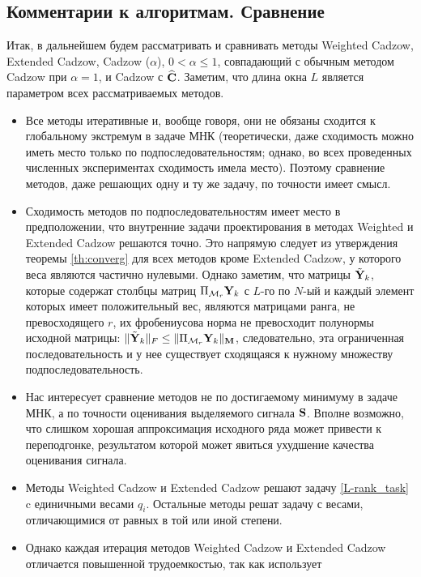 \documentclass[12pt,a4paper,fleqn,leqno]{article}
\begin{document}
\subsection{Комментарии к алгоритмам. Сравнение}

Итак, в дальнейшем будем рассматривать и сравнивать методы
Weighted Cadzow, Extended Cadzow, Cadzow ($\alpha$), $0< \alpha \leq 1$, совпадающий с обычным методом Cadzow при $\alpha=1$,
и Cadzow с $\widehat {\mathbf{C}}$.
Заметим, что длина окна $L$ является параметром всех рассматриваемых методов.

\begin{itemize}
\item
Все методы итеративные и, вообще говоря, они не обязаны сходится к глобальному экстремум в задаче МНК  (теоретически, даже сходимость можно иметь место только по подпоследовательностям; однако, во всех проведенных численных экспериментах сходимость имела место). Поэтому сравнение методов, даже
решающих одну и ту же задачу,  по точности имеет смысл.
\item
Сходимость методов по подпоследовательностям имеет место в предположении, что внутренние задачи проектирования в методах Weighted и Extended Cadzow решаются точно. Это напрямую следует из утверждения теоремы \ref{th:converg} для всех методов кроме Extended Cadzow, у которого веса являются частично нулевыми. Однако заметим, что  матрицы $\tilde {\mathbf{Y}}_k$, которые содержат столбцы матриц $\Pi_{\mathcal{M}_r} \mathbf{Y}_k$ с $L$-го по $N$-ый и каждый элемент которых имеет положительный вес, являются матрицами ранга, не превосходящего $r$, их фробениусова норма не превосходит полунормы исходной матрицы: $\|\tilde {\mathbf{Y}}_k\|_F \le \|\Pi_{\mathcal{M}_r} \mathbf{Y}_k\|_{\mathbf{M}}$, следовательно, эта ограниченная последовательность и у нее существует сходящаяся к нужному множеству подпоследовательность.
\item
Нас интересует сравнение методов не по достигаемому минимуму в задаче МНК, а по точности оценивания выделяемого сигнала $\mathbf{S}$.
Вполне возможно, что слишком хорошая аппроксимация исходного ряда может привести к переподгонке, результатом которой
может явиться ухудшение качества оценивания сигнала.
\item
Методы Weighted Cadzow и Extended Cadzow решают задачу \eqref{L-rank_task} c единичными весами $q_i$. Остальные методы решат задачу с весами, отличающимися от равных в той или иной степени.
\item
Однако каждая итерация методов Weighted Cadzow и Extended Cadzow отличается повышенной трудоемкостью, так как использует

\end{itemize}
\end{document}
